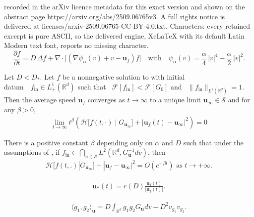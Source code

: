 \documentclass[10pt,a4paper]{amsart}
\begin{document}
recorded in the arXiv licence metadata for this exact version and shown on the abstract page https://arxiv.org/abs/2509.06765v3. A full rights notice is delivered at licenses/arxiv-2509.06765-CC-BY-4.0.txt. Characters: every retained excerpt is pure ASCII, so the delivered engine, XeLaTeX with its default Latin Modern text font, reports no missing character.
\begin{equation}
\label{PDE}
\frac{\partial f}{\partial t} = D \, \Delta f + \nabla \cdot \big[ \left(\nabla \psi_{\alpha}(v)+v - \mathbf{u}_{f}   \right) f\big]\quad \text{with} \quad \psi_{\alpha}(v) = \frac{\alpha}{4} \,|v|^4 - \frac{\alpha}{2}\,|v|^2.
\end{equation}

\begin{theorem}{}
\label{thm2}
Let $D<D_*$. Let $f$ be a nonnegative solution to  with  initial \\ \mbox{datum ~$f_{\mathrm{\mathrm{in}} } \in L^1_+(\mathbb{R}^d)$} such that ~$\mathcal{F}[f_{\mathrm{\mathrm{in}}}]<\mathcal{F}[G_{0}]$ and ~$\| f_{\mathrm{in}}\|_{L^1(\mathbb{R}^d)}=1$. Then
   the average speed $\mathbf{u}_{f}$ converges as $t \rightarrow\infty$ to a unique limit $\mathbf{u}_{\infty} \in \mathcal{S}$ and for any $\beta>0$,
  \begin{align*}
\lim_{t\rightarrow \infty} t^{\beta}\left(\mathcal{H}\big[f(t,\cdot) \mid G_{\mathbf{u}_{\infty}}\big] + |\mathbf{u}_{f}(t) - \mathbf{u}_{\infty}|^2\right) = 0
\end{align*}

\end{theorem}

\begin{theorem}{}
\label{thm3}
There is a positive constant $\beta$ depending only on $\alpha$ and $D$ such that under the assumptions of , if $f_{\mathrm{in}} \in \bigcap_{u \in \mathcal{S}} L^2(\mathbb{R}^d,G_\mathbf{u}^{-1}dv)$, then
     \begin{align*}
         \mathcal{H}\big[f(t,.)|G_{\mathbf{u}_{\infty}}\big] +|\mathbf{u}_{f}-\mathbf{u}_{\infty}|^2 =O(e^{-\beta t}) \text{ as } t\rightarrow +\infty.
     \end{align*}
\end{theorem}

\begin{align}
\label{ustar}
    \mathbf{u}_{*}(t)= r(D) \frac{\mathbf{u}_{f}(t)}{|\mathbf{u}_{f}(t)|}. 
\end{align}

 \begin{align}
 \label{definitionQ1}
    \langle g_1,g_2\rangle_{\mathbf{u}} = D \int_{\mathbb{R}^d}g_1g_2 G_{\mathbf{u}_{}}dv -D^2 v_{g_1}v_{g_2}.
    \end{align}
\end{document}
